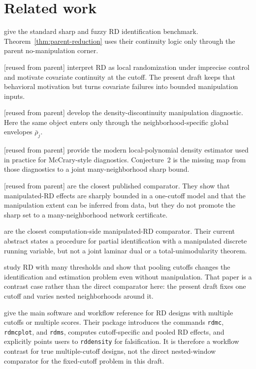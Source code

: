 \documentclass[11pt]{article}
\theoremstyle{definition}
\theoremstyle{plain}
\theoremstyle{remark}
\begin{document}
\section{Related work}
\citet{hahn_todd_van_der_klaauw_2001} give the standard sharp and fuzzy RD identification
benchmark. Theorem~\ref{thm:parent-reduction} uses their continuity logic only through the
parent no-manipulation corner.

\citet{lee_2008_local_randomization} [reused from parent] interpret RD as local randomization
under imprecise control and motivate covariate continuity at the cutoff. The present draft
keeps that behavioral motivation but turns covariate failures into bounded manipulation inputs.

\citet{mccrary_2008_density_test} [reused from parent] develop the density-discontinuity
manipulation diagnostic. Here the same object enters only through the neighborhood-specific
global envelopes \(\bar\rho_j\).

\citet{cattaneo_jansson_ma_2020_density} [reused from parent] provide the modern local-polynomial
density estimator used in practice for McCrary-style diagnostics. Conjecture~2 is the missing
map from those diagnostics to a joint many-neighborhood sharp bound.

\citet[Abstract]{gerard_rokkanen_rothe_2020_rdbounds} [reused from parent] are the closest
published comparator. They show that manipulated-RD effects are sharply bounded in a one-cutoff
model and that the manipulation extent can be inferred from data, but they do not promote the
sharp set to a many-neighborhood network certificate.

\citet[Abstract]{rosenman_rajkumar_gauriot_slonim_2019_discrete_manipulation} are the closest
computation-side manipulated-RD comparator. Their current abstract states a procedure for partial
identification with a manipulated discrete running variable, but not a joint laminar dual or a
total-unimodularity theorem.

\citet[Abstract; pp.~216--217]{bertanha_2020_many_thresholds} study RD with many thresholds and
show that pooling cutoffs changes the identification and estimation problem even without
manipulation. That paper is a contrast case rather than the direct comparator here: the present
draft fixes one cutoff and varies nested neighborhoods around it.

\citet[pp.~867--868, Sec.~2]{cattaneo_titiunik_vazquez_bare_2020_rdmulti} give the main software
and workflow reference for RD designs with multiple cutoffs or multiple scores. Their package
introduces the commands \texttt{rdmc}, \texttt{rdmcplot}, and \texttt{rdms}, computes
cutoff-specific and pooled RD effects, and explicitly points users to \texttt{rddensity} for
falsification. It is therefore a workflow contrast for true multiple-cutoff designs, not the
direct nested-window comparator for the fixed-cutoff problem in this draft.
\end{document}

